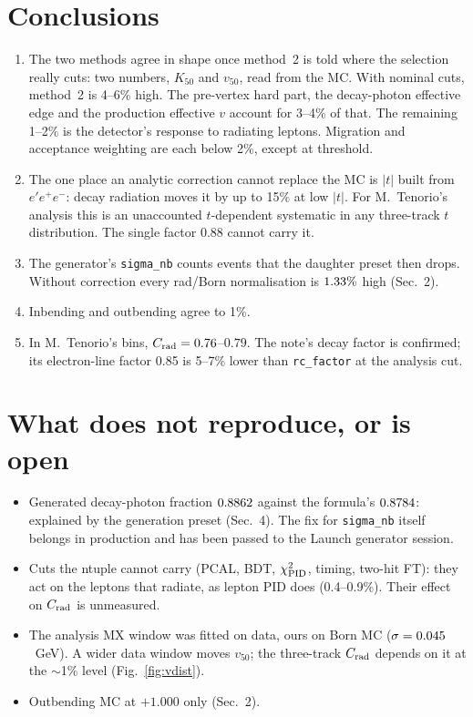 \documentclass[11pt]{article}
\newcommand{\crad}{C_{\rm rad}}
\begin{document}
\section{Conclusions}
\begin{enumerate}
\item The two methods agree in shape once method~2 is told where the selection really cuts: two numbers, $K_{50}$ and
$v_{50}$, read from the MC. With nominal cuts, method~2 is 4--6\% high. The pre-vertex hard part, the decay-photon
effective edge and the production effective $v$ account for 3--4\% of that. The remaining 1--2\% is the detector's
response to radiating leptons. Migration and acceptance weighting are each below 2\%, except at threshold.
\item The one place an analytic correction cannot replace the MC is $|t|$ built from $e'e^+e^-$: decay radiation moves it
by up to 15\% at low $|t|$. For M.~Tenorio's analysis this is an unaccounted $t$-dependent systematic in any three-track $t$
distribution. The single factor 0.88 cannot carry it.
\item The generator's \texttt{sigma\_nb} counts events that the daughter preset then drops. Without correction every
rad/Born normalisation is $1.33\%$ high (Sec.~2).
\item Inbending and outbending agree to 1\%.
\item In M.~Tenorio's bins, $\crad=0.76$--$0.79$. The note's decay factor is confirmed; its electron-line factor 0.85 is 5--7\% lower than
\texttt{rc\_factor} at the analysis cut.
\end{enumerate}

\section{What does not reproduce, or is open}
\begin{itemize}
\item Generated decay-photon fraction $0.8862$ against the formula's $0.8784$: explained by the generation preset (Sec.~4).
The fix for \texttt{sigma\_nb} itself belongs in production and has been passed to the Launch generator session.
\item Cuts the ntuple cannot carry (PCAL, BDT, $\chi^2_{\rm PID}$, timing, two-hit FT): they act on the leptons that radiate, as lepton PID does
(0.4--0.9\%). Their effect on $\crad$ is unmeasured.
\item The analysis MX window was fitted on data, ours on Born MC ($\sigma=0.045$~GeV). A wider data window moves $v_{50}$; the
three-track $\crad$ depends on it at the $\sim$1\% level (Fig.~\ref{fig:vdist}).
\item Outbending MC at $+1.000$ only (Sec.~2).
\end{itemize}
\end{document}
